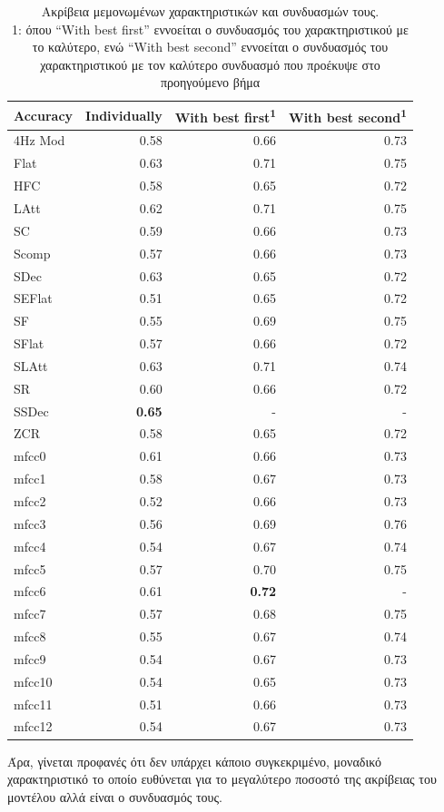 \begin{table}[H]
	\centering
	\begin{tabular}{ l r r r }
		\textbf{Accuracy} & \textbf{Individually} & \textbf{With best first\textsuperscript{1}} & \textbf{With best second\textsuperscript{1}} \\ \toprule
		4Hz Mod & 0.58 & 0.66 & 0.73 \\
		Flat & 0.63 & 0.71 & 0.75 \\
		HFC & 0.58 & 0.65 & 0.72 \\ \midrule
		LAtt & 0.62 & 0.71 & 0.75 \\
		SC & 0.59 & 0.66 & 0.73 \\
		Scomp & 0.57 & 0.66 & 0.73 \\ \midrule
		SDec & 0.63 & 0.65 & 0.72 \\
		SEFlat & 0.51 & 0.65 & 0.72 \\
		SF & 0.55 & 0.69 & 0.75 \\ \midrule
		SFlat & 0.57 & 0.66 & 0.72 \\
		SLAtt & 0.63 & 0.71 & 0.74 \\
		SR & 0.60 & 0.66 & 0.72 \\ \midrule
		SSDec & \textbf{0.65} & - & - \\
		ZCR & 0.58 & 0.65 & 0.72 \\
		mfcc0 & 0.61 & 0.66 & 0.73 \\ \midrule
		mfcc1 & 0.58 & 0.67 & 0.73 \\
		mfcc2 & 0.52 & 0.66 & 0.73 \\
		mfcc3 & 0.56 & 0.69 & 0.76 \\ \midrule
		mfcc4 & 0.54 & 0.67 & 0.74 \\
		mfcc5 & 0.57 & 0.70 & 0.75 \\
		mfcc6 & 0.61 & \textbf{0.72} & - \\ \midrule
		mfcc7 & 0.57 & 0.68 & 0.75 \\
		mfcc8 & 0.55 & 0.67 & 0.74 \\
		mfcc9 & 0.54 & 0.67 & 0.73 \\ \midrule
		mfcc10 & 0.54 & 0.65 & 0.73 \\
		mfcc11 & 0.51 & 0.66 & 0.73 \\
		mfcc12 & 0.54 & 0.67 & 0.73 \\ \bottomrule
	\end{tabular}
	\caption{Ακρίβεια μεμονωμένων χαρακτηριστικών και συνδυασμών τους. \vspace{1em}\\\tiny
	1: όπου ``With best first'' εννοείται ο συνδυασμός του χαρακτηριστικού με το καλύτερο, ενώ ``With best second'' εννοείται ο συνδυασμός του χαρακτηριστικού με τον καλύτερο συνδυασμό που προέκυψε στο προηγούμενο βήμα}
\end{table}

Άρα, γίνεται προφανές ότι δεν υπάρχει κάποιο συγκεκριμένο, μοναδικό χαρακτηριστικό το οποίο ευθύνεται για το μεγαλύτερο ποσοστό της ακρίβειας του μοντέλου αλλά είναι ο συνδυασμός τους.
